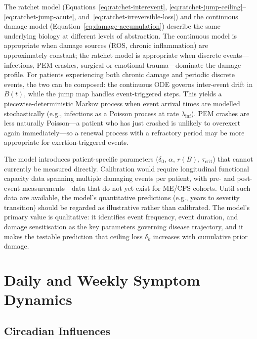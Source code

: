 The ratchet model (Equations~\ref{eq:ratchet-interevent}, \ref{eq:ratchet-jump-ceiling}--\ref{eq:ratchet-jump-acute}, and~\ref{eq:ratchet-irreversible-loss}) and the continuous damage model (Equation~\ref{eq:damage-accumulation}) describe the same underlying biology at different levels of abstraction. The continuous model is appropriate when damage sources (ROS, chronic inflammation) are approximately constant; the ratchet model is appropriate when discrete events---infections, PEM crashes, surgical or emotional trauma---dominate the damage profile. For patients experiencing both chronic damage and periodic discrete events, the two can be composed: the continuous ODE governs inter-event drift in $B(t)$, while the jump map handles event-triggered steps. This yields a piecewise-deterministic Markov process when event arrival times are modelled stochastically (e.g., infections as a Poisson process at rate $\lambda_{\text{inf}}$). PEM crashes are less naturally Poisson---a patient who has just crashed is unlikely to overexert again immediately---so a renewal process with a refractory period may be more appropriate for exertion-triggered events.

\begin{limitation}
The model introduces patient-specific parameters ($\delta_0$, $\alpha$, $r(B)$, $\tau_{\text{crit}}$) that cannot currently be measured directly. Calibration would require longitudinal functional capacity data spanning multiple damaging events per patient, with pre- and post-event measurements---data that do not yet exist for ME/CFS cohorts. Until such data are available, the model's quantitative predictions (e.g., years to severity transition) should be regarded as illustrative rather than calibrated. The model's primary value is qualitative: it identifies event frequency, event duration, and damage sensitisation as the key parameters governing disease trajectory, and it makes the testable prediction that ceiling loss $\delta_k$ increases with cumulative prior damage.
\end{limitation}

\section{Daily and Weekly Symptom Dynamics}
\label{sec:daily-dynamics}

\subsection{Circadian Influences}
\label{sec:circadian-influences}

